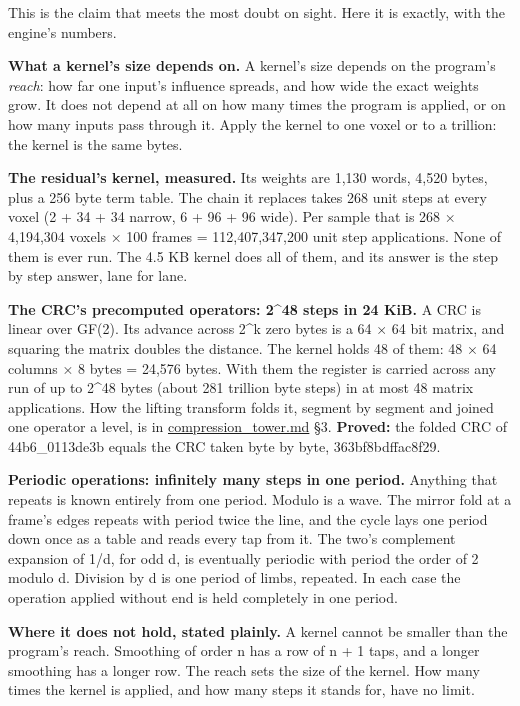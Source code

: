 This is the claim that meets the most doubt on sight. Here it is exactly, with the engine's numbers.

\textbf{What a kernel's size depends on.} A kernel's size depends on the program's \emph{reach}: how far one input's influence spreads, and how wide the exact weights grow. It does not depend at all on how many times the program is applied, or on how many inputs pass through it. Apply the kernel to one voxel or to a trillion: the kernel is the same bytes.

\textbf{The residual's kernel, measured.} Its weights are 1,130 words, 4,520 bytes, plus a 256 byte term table. The chain it replaces takes 268 unit steps at every voxel (2 + 34 + 34 narrow, 6 + 96 + 96 wide). Per sample that is 268 × 4,194,304 voxels × 100 frames = 112,407,347,200 unit step applications. None of them is ever run. The 4.5 KB kernel does all of them, and its answer is the step by step answer, lane for lane.

\textbf{The CRC's precomputed operators: 2\textasciicircum{}48 steps in 24 KiB.} A CRC is linear over GF(2). Its advance across 2\textasciicircum{}k zero bytes is a 64 × 64 bit matrix, and squaring the matrix doubles the distance. The kernel holds 48 of them: 48 × 64 columns × 8 bytes = 24,576 bytes. With them the register is carried across any run of up to 2\textasciicircum{}48 bytes (about 281 trillion byte steps) in at most 48 matrix applications. How the lifting transform folds it, segment by segment and joined one operator a level, is in \hyperref[chap:compression-tower]{compression\_\allowbreak{}tower.md} §3. \textbf{Proved:} the folded CRC of 44b6\_\allowbreak{}0113de3b equals the CRC taken byte by byte, 363bf8bdffac8f29.

\textbf{Periodic operations: infinitely many steps in one period.} Anything that repeats is known entirely from one period. Modulo is a wave. The mirror fold at a frame's edges repeats with period twice the line, and the cycle lays one period down once as a table and reads every tap from it. The two's complement expansion of 1/d, for odd d, is eventually periodic with period the order of 2 modulo d. Division by d is one period of limbs, repeated. In each case the operation applied without end is held completely in one period.

\textbf{Where it does not hold, stated plainly.} A kernel cannot be smaller than the program's reach. Smoothing of order n has a row of n + 1 taps, and a longer smoothing has a longer row. The reach sets the size of the kernel. How many times the kernel is applied, and how many steps it stands for, have no limit.

